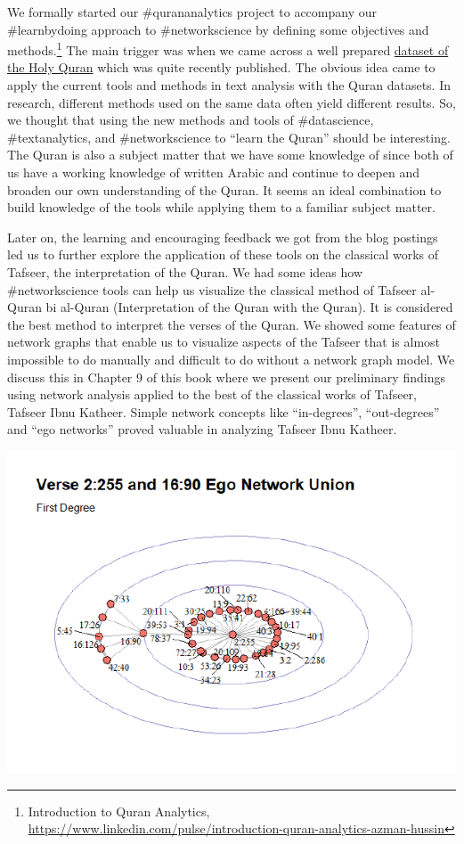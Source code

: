 \documentclass[
]{article}
\begin{document}
We formally started our \#qurananalytics project to accompany our \#learnbydoing approach to \#networkscience by defining some objectives and methods.\footnote{Introduction to Quran Analytics, \url{https://www.linkedin.com/pulse/introduction-quran-analytics-azman-hussin}} The main trigger was when we came across a well prepared \href{https://CRAN.R-project.org/package=quRan}{dataset of the Holy Quran} which was quite recently published. The obvious idea came to apply the current tools and methods in text analysis with the Quran datasets. In research, different methods used on the same data often yield different results. So, we thought that using the new methods and tools of \#datascience, \#textanalytics, and \#networkscience to ``learn the Quran'' should be interesting. The Quran is also a subject matter that we have some knowledge of since both of us have a working knowledge of written Arabic and continue to deepen and broaden our own understanding of the Quran. It seems an ideal combination to build knowledge of the tools while applying them to a familiar subject matter.

Later on, the learning and encouraging feedback we got from the blog postings led us to further explore the application of these tools on the classical works of Tafseer, the interpretation of the Quran. We had some ideas how \#networkscience tools can help us visualize the classical method of Tafseer al-Quran bi al-Quran (Interpretation of the Quran with the Quran). It is considered the best method to interpret the verses of the Quran. We showed some features of network graphs that enable us to visualize aspects of the Tafseer that is almost impossible to do manually and difficult to do without a network graph model. We discuss this in Chapter 9 of this book where we present our preliminary findings using network analysis applied to the best of the classical works of Tafseer, Tafseer Ibnu Katheer. Simple network concepts like ``in-degrees'', ``out-degrees'' and ``ego networks'' proved valuable in analyzing Tafseer Ibnu Katheer.

\begin{center}\includegraphics{00-index_files/figure-latex/unnamed-chunk-3-1} \end{center}
\end{document}
